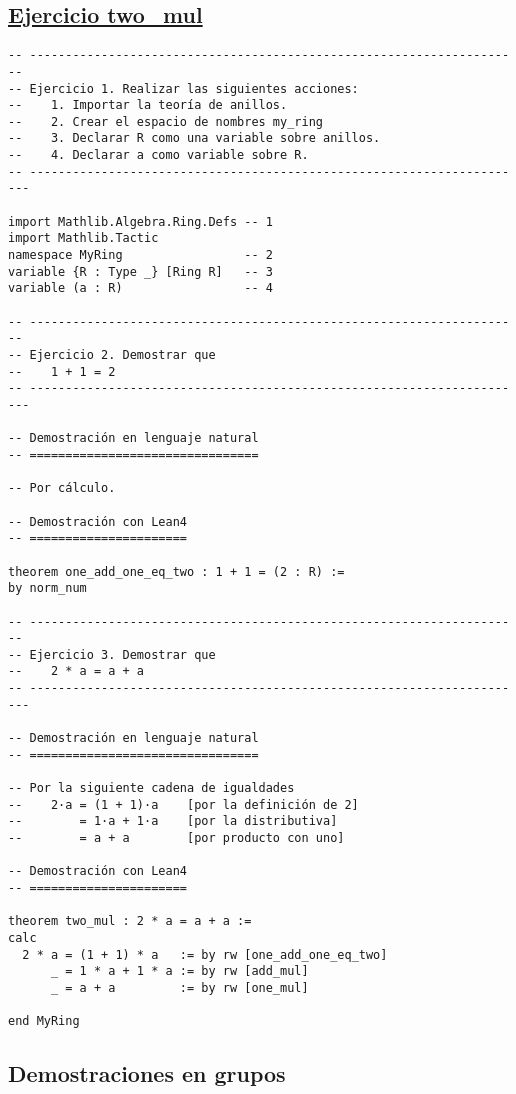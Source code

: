 \subsection{\href{./src/Basicos/two\_mul.lean}{Ejercicio two\_mul}}
\label{sec:org9a661f6}
\begin{verbatim}
-- ---------------------------------------------------------------------
-- Ejercicio 1. Realizar las siguientes acciones:
--    1. Importar la teoría de anillos.
--    2. Crear el espacio de nombres my_ring
--    3. Declarar R como una variable sobre anillos.
--    4. Declarar a como variable sobre R.
-- ----------------------------------------------------------------------

import Mathlib.Algebra.Ring.Defs -- 1
import Mathlib.Tactic
namespace MyRing                 -- 2
variable {R : Type _} [Ring R]   -- 3
variable (a : R)                 -- 4

-- ---------------------------------------------------------------------
-- Ejercicio 2. Demostrar que
--    1 + 1 = 2
-- ----------------------------------------------------------------------

-- Demostración en lenguaje natural
-- ================================

-- Por cálculo.

-- Demostración con Lean4
-- ======================

theorem one_add_one_eq_two : 1 + 1 = (2 : R) :=
by norm_num

-- ---------------------------------------------------------------------
-- Ejercicio 3. Demostrar que
--    2 * a = a + a
-- ----------------------------------------------------------------------

-- Demostración en lenguaje natural
-- ================================

-- Por la siguiente cadena de igualdades
--    2·a = (1 + 1)·a    [por la definición de 2]
--        = 1·a + 1·a    [por la distributiva]
--        = a + a        [por producto con uno]

-- Demostración con Lean4
-- ======================

theorem two_mul : 2 * a = a + a :=
calc
  2 * a = (1 + 1) * a   := by rw [one_add_one_eq_two]
      _ = 1 * a + 1 * a := by rw [add_mul]
      _ = a + a         := by rw [one_mul]

end MyRing
\end{verbatim}

\subsection{Demostraciones en grupos}
\label{sec:org7559f64}

